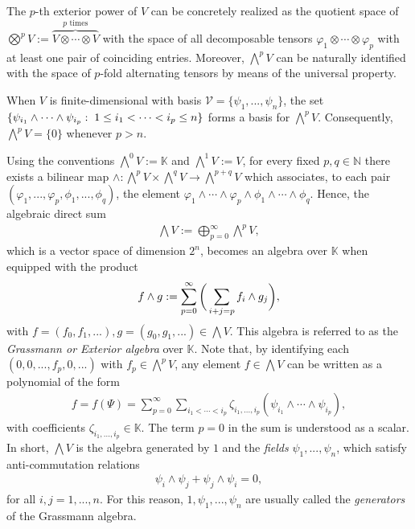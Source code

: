 \documentclass[12pt,twoside]{amsart}
\numberwithin{equation}{section}
\begin{document}
The $p$-th exterior power of $V$ can be concretely realized as the quotient space of $\bigotimes^{p}V := \overbrace{V\otimes \cdots \otimes V}^{\text{$p$ times}}$ with the space of all decomposable tensors $\varphi_{1}\otimes \cdots \otimes \varphi_{p}$ with at least one pair of coinciding entries. Moreover, $\bigwedge^{p}V$ can be naturally identified with the space of $p$-fold alternating tensors by means of the universal property. 

When $V$ is finite-dimensional with basis $\mathcal{V} = \{\psi_{1},...,\psi_{n}\}$, the set $\{\psi_{i_{1}}\wedge \cdots \wedge \psi_{i_{p}}: \hspace{0.1cm} 1 \le i_{1} < \cdots < i_{p}\le n\}$ forms a basis for $\bigwedge^{p}V$. Consequently, $\bigwedge^{p}V = \{0\}$ whenever $p > n$. 

Using the conventions $\bigwedge^{0} V := \mathbb{K}$ and $\bigwedge^{1}V := V$, for every fixed $p, q \in \mathbb{N}$ there exists a bilinear map $\wedge: \bigwedge^{p}V \times \bigwedge^{q}V \to \bigwedge^{p+q}V$ which associates, to each pair $(\varphi_{1},...,\varphi_{p},\phi_{1},...,\phi_{q})$, the element $\varphi_{1}\wedge \cdots \wedge \varphi_{p}\wedge \phi_{1}\wedge \cdots \wedge \phi_{q}$. Hence, the algebraic direct sum
\begin{eqnarray}
\bigwedge V := \bigoplus_{p=0}^{\infty}\bigwedge^{p}V, \label{GA2}
\end{eqnarray}
which is a vector space of dimension $2^{n}$, becomes an algebra over $\mathbb{K}$ when equipped with the product
\begin{eqnarray}
f\wedge g := \sum_{p=0}^{\infty}\bigg{(}\sum_{i+j = p}f_{i}\wedge g_{j}\bigg{)}, \label{GA3}
\end{eqnarray}
with $f = (f_{0},f_{1},...),g = (g_{0},g_{1},...) \in \bigwedge V$. This algebra is referred to as the \textit{Grassmann or Exterior algebra} over $\mathbb{K}$. Note that, by identifying each $(0,0,...,f_{p},0,...)$ with $f_{p}\in \bigwedge^{p}V$, any element $f \in \bigwedge V$ can be written as a polynomial of the form
\begin{eqnarray}
f = f(\Psi) = \sum_{p=0}^{\infty}\sum_{i_{1}<\cdots < i_{p}}\zeta_{i_{1},...,i_{p}}(\psi_{i_{1}}\wedge \cdots \wedge \psi_{i_{p}}), \label{GA4}
\end{eqnarray}
with coefficients $\zeta_{i_{1},...,i_{p}}\in \mathbb{K}$. The term $p=0$ in the sum is understood as a scalar. In short, $\bigwedge V$ is the algebra generated by $1$ and the \textit{fields} $\psi_{1},...,\psi_{n}$, which satisfy anti-commutation relations
\begin{eqnarray}
\psi_{i}\wedge \psi_{j} + \psi_{j}\wedge \psi_{i} = 0, \label{GA5}
\end{eqnarray}
for all $i,j=1,...,n$. For this reason, $1, \psi_{1},...,\psi_{n}$ are usually called the \textit{generators} of the Grassmann algebra. 
\end{document}
